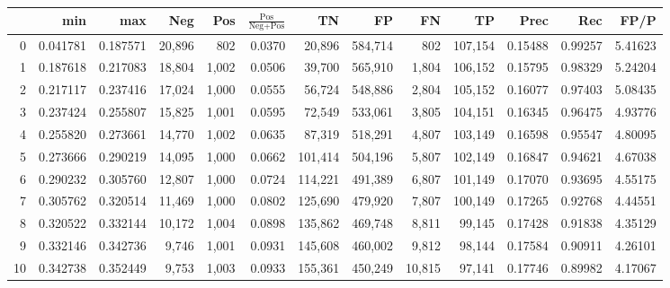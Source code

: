 \begin{tabular}{rrrrrrrrrrrrr}
\toprule
{} &       min &       max &     Neg &    Pos & $\frac{\text{Pos}}{\text{Neg}+\text{Pos}}$ &       TN &       FP &       FN &       TP &     Prec &      Rec &     FP/P \\
\midrule
0   &  0.041781 &  0.187571 &  20,896 &    802 &                                     0.0370 &   20,896 &  584,714 &      802 &  107,154 &  0.15488 &  0.99257 &  5.41623 \\
1   &  0.187618 &  0.217083 &  18,804 &  1,002 &                                     0.0506 &   39,700 &  565,910 &    1,804 &  106,152 &  0.15795 &  0.98329 &  5.24204 \\
2   &  0.217117 &  0.237416 &  17,024 &  1,000 &                                     0.0555 &   56,724 &  548,886 &    2,804 &  105,152 &  0.16077 &  0.97403 &  5.08435 \\
3   &  0.237424 &  0.255807 &  15,825 &  1,001 &                                     0.0595 &   72,549 &  533,061 &    3,805 &  104,151 &  0.16345 &  0.96475 &  4.93776 \\
4   &  0.255820 &  0.273661 &  14,770 &  1,002 &                                     0.0635 &   87,319 &  518,291 &    4,807 &  103,149 &  0.16598 &  0.95547 &  4.80095 \\
5   &  0.273666 &  0.290219 &  14,095 &  1,000 &                                     0.0662 &  101,414 &  504,196 &    5,807 &  102,149 &  0.16847 &  0.94621 &  4.67038 \\
6   &  0.290232 &  0.305760 &  12,807 &  1,000 &                                     0.0724 &  114,221 &  491,389 &    6,807 &  101,149 &  0.17070 &  0.93695 &  4.55175 \\
7   &  0.305762 &  0.320514 &  11,469 &  1,000 &                                     0.0802 &  125,690 &  479,920 &    7,807 &  100,149 &  0.17265 &  0.92768 &  4.44551 \\
8   &  0.320522 &  0.332144 &  10,172 &  1,004 &                                     0.0898 &  135,862 &  469,748 &    8,811 &   99,145 &  0.17428 &  0.91838 &  4.35129 \\
9   &  0.332146 &  0.342736 &   9,746 &  1,001 &                                     0.0931 &  145,608 &  460,002 &    9,812 &   98,144 &  0.17584 &  0.90911 &  4.26101 \\
10  &  0.342738 &  0.352449 &   9,753 &  1,003 &                                     0.0933 &  155,361 &  450,249 &   10,815 &   97,141 &  0.17746 &  0.89982 &  4.17067 \\

\end{tabular}
